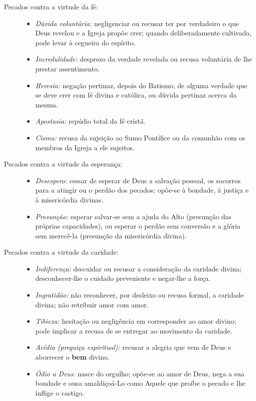 \begin{description}

    \item[Pecados contra a virtude da fé:]
          \begin{itemize}
              \item \textit{Dúvida voluntária:} negligenciar ou recusar ter por verdadeiro o que Deus revelou e a Igreja propõe crer; quando deliberadamente cultivada, pode levar à cegueira do espírito.
              \item \textit{Incredulidade:} desprezo da verdade revelada ou recusa voluntária de lhe prestar assentimento.
              \item \textit{Heresia:} negação pertinaz, depois do Batismo, de alguma verdade que se deve crer com fé divina e católica, ou dúvida pertinaz acerca da mesma.
              \item \textit{Apostasia:} repúdio total da fé cristã.
              \item \textit{Cisma:} recusa da sujeição ao Sumo Pontífice ou da comunhão com os membros da Igreja a ele sujeitos.
          \end{itemize}

    \item[Pecados contra a virtude da esperança:]
          \begin{itemize}
              \item \textit{Desespero:} cessar de esperar de Deus a salvação pessoal, os socorros para a atingir ou o perdão dos pecados; opõe-se à bondade, à justiça e à misericórdia divinas.
              \item \textit{Presunção:} esperar salvar-se sem a ajuda do Alto (presunção das próprias capacidades), ou esperar o perdão sem conversão e a glória sem merecê-la (presunção da misericórdia divina).
          \end{itemize}

    \item[Pecados contra a virtude da caridade:]
          \begin{itemize}
              \item \textit{Indiferença:} descuidar ou recusar a consideração da caridade divina; desconhecer-lhe o cuidado preveniente e negar-lhe a força.
              \item \textit{Ingratidão:} não reconhecer, por desleixo ou recusa formal, a caridade divina; não retribuir amor com amor.
              \item \textit{Tibieza:} hesitação ou negligência em corresponder ao amor divino; pode implicar a recusa de se entregar ao movimento da caridade.
              \item \textit{Acédia (preguiça espiritual):} recusar a alegria que vem de Deus e aborrecer o \textbf{bem} divino.
              \item \textit{Ódio a Deus:} nasce do orgulho; opõe-se ao amor de Deus, nega a sua bondade e ousa amaldiçoá-Lo como Aquele que proíbe o pecado e lhe inflige o castigo.
          \end{itemize}


\end{description}
